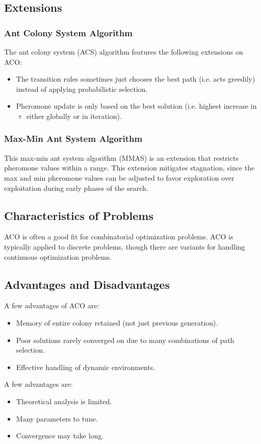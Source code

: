 \documentclass[12pt,titlepage]{article}
\begin{document}
    \subsection{Extensions}

      \subsubsection{Ant Colony System Algorithm}
        The ant colony system (ACS) algorithm features the following extensions on ACO:
        \begin{itemize}
          \item The transition rules sometimes just chooses the best path (i.e. acts greedily) instead of applying probabilistic selection.
          \item Pheromone update is only based on the best solution (i.e. highest increase in $\uptau$ either globally or in iteration).
        \end{itemize}

      \subsubsection{Max-Min Ant System Algorithm}
        This max-min ant system algorithm (MMAS) is an extension that restricts pheromone values within a range. This extension
        mitigates stagnation, since the max and min pheromone values can be adjusted to favor exploration over exploitation during early
        phases of the search.

    \subsection{Characteristics of Problems}
      ACO is often a good fit for combinatorial optimization problems. ACO is typically applied to discrete problems, though there are variants
      for handling continuous optimization problems.

    \subsection{Advantages and Disadvantages}
      A few advantages of ACO are:
      \begin{itemize}
        \item Memory of entire colony retained (not just previous generation).
        \item Poor solutions rarely converged on due to many combinations of path selection.
        \item Effective handling of dynamic environments.
      \end{itemize}

      A few advantages are:
      \begin{itemize}
        \item Theoretical analysis is limited.
        \item Many parameters to tune.
        \item Convergence may take long.
      \end{itemize}
\end{document}
